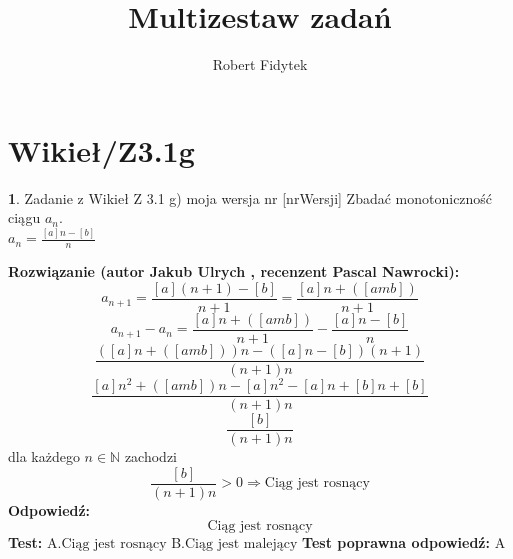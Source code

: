 \documentclass[12pt, a4paper]{article}
\title{Multizestaw zadań}
\author{Robert Fidytek}
\date{}
\theoremstyle{definition} %
\newtheorem{zad}{}
\newcommand{\kategoria}[1]{\section{#1}} %
\newcommand{\zadStart}[1]{\begin{zad}#1\newline} %
\newcommand{\zadStop}{\end{zad}}   %
\newcommand{\rozwStart}[2]{\noindent \textbf{Rozwiązanie (autor #1 , recenzent #2): }\newline} %
\newcommand{\rozwStop}{\newline}                                            %
\newcommand{\odpStart}{\noindent \textbf{Odpowiedź:}\newline}    %
\newcommand{\odpStop}{\newline}                                             %
\newcommand{\testStart}{\noindent \textbf{Test:}\newline} %
\newcommand{\testStop}{\newline} %
\newcommand{\kluczStart}{\noindent \textbf{Test poprawna odpowiedź:}\newline} %
\newcommand{\kluczStop}{\newline} %
\begin{document}
\maketitle


\kategoria{Wikieł/Z3.1g}
\zadStart{Zadanie z Wikieł Z 3.1 g) moja wersja nr [nrWersji]}
Zbadać monotoniczność ciągu $a_{n}$.\\ $a_{n}=\frac{[a]n-[b]}{n}$
\zadStop
\rozwStart{Jakub Ulrych}{Pascal Nawrocki}
$$a_{n+1}=\frac{[a](n+1)-[b]}{n+1}=\frac{[a]n+([amb])}{n+1}$$
$$a_{n+1}-a_{n}=\frac{[a]n+([amb])}{n+1}-\frac{[a]n-[b]}{n}$$
$$\frac{([a]n+([amb]))n-([a]n-[b])(n+1)}{(n+1)n}$$
$$\frac{[a]n^{2}+([amb])n-[a]n^{2}-[a]n+[b]n+[b]}{(n+1)n}$$
$$\frac{[b]}{(n+1)n}$$
dla każdego $n\in\mathbb{N}$ zachodzi
$$\frac{[b]}{(n+1)n}>0\Rightarrow \text{Ciąg jest rosnący}$$
\rozwStop
\odpStart
$$\text{Ciąg jest rosnący}$$
\odpStop
\testStart
A.$\text{Ciąg jest rosnący}$
B.$\text{Ciąg jest malejący}$
\testStop
\kluczStart
A
\kluczStop
\end{document}
